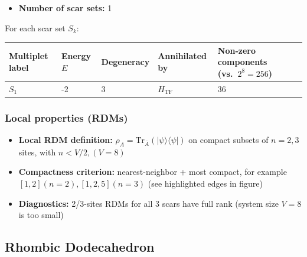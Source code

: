 \documentclass[11pt,a4paper]{article}
\newcommand{\Htf}{H_{\mathrm{TF}}}
\begin{document}
\begin{itemize}[leftmargin=1.5em]
  \item \textbf{Number of scar sets:} 1
  \end{itemize}
  \hspace{6mm}For each scar set $S_k$:\\

\begin{center}
\begin{tabular}{L{3.5cm} C{2.2cm} C{2.2cm} C{2.2cm} C{3.0cm} C{3.2cm}}
\toprule
\textbf{Multiplet label} & \textbf{Energy $E$} & \textbf{Degeneracy} & \textbf{Annihilated by} & \textbf{Non-zero components (vs.\ $2^{8} = 256$)} \\
\midrule
$S_1$ & -2 & 3 & $\Htf$ & 36\\
\bottomrule
\end{tabular}
\end{center}

\subsubsection*{Local properties (RDMs)}

\begin{itemize}[leftmargin=1.5em]
  \item \textbf{Local RDM definition:} $\rho_A=\mathrm{Tr}_{\bar A}(|\psi\rangle\langle\psi|)$ on compact subsets of $n=2,3$ sites, with $n < V/2, (V=8)$
  \item \textbf{Compactness criterion:} nearest-neighbor + most compact, for example $[1,2] (n = 2), [1,2,5] (n = 3)$ (see highlighted edges in figure)
  \item \textbf{Diagnostics:} 2/3-sites RDMs for all 3 scars have full rank (system size $V=8$ is too small)
\end{itemize}


\subsection*{Rhombic Dodecahedron}
\end{document}
